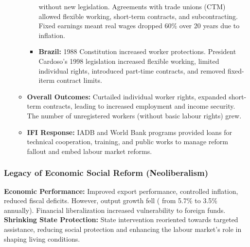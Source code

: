 \documentclass{article}
\begin{document}
\begin{itemize}
\begin{itemize}
\begin{itemize}
                without new legislation. Agreements with trade unions (CTM)
                allowed flexible working, short-term contracts, and
                subcontracting. Fixed earnings meant real wages dropped 60\%
                over 20 years due to inflation.
                \item \textbf{Brazil:} 1988 Constitution increased worker
                protections. President Cardoso's 1998 legislation increased
                flexible working, limited individual rights, introduced
                part-time contracts, and removed fixed-iterm contract limits.
            \end{itemize}
            \item \textbf{Overall Outcomes:} Curtailed individual worker
            rights, expanded short-term contracts, leading to increased
            employment and income security. The number of unregistered
            workers (without basic labour rights) grew.
            \item \textbf{IFI Response:} IADB and World Bank programs
            provided loans for technical cooperation, training, and public
            works to manage reform fallout and embed labour market reforms.
        \end{itemize}
    \end{itemize}

    \subsubsection{Legacy of Economic Social Reform (Neoliberalism)}

    \noindent \textbf{Economic Performance:} Improved export performance,
controlled inflation, reduced fiscal deficits. However, output growth fell (
from 5.7\% to 3.5\% annually). Financial liberalization increased
vulnerability to foreign funds.\\

    \noindent \textbf{Shrinking State Protection:} State intervention
reoriented towards targeted assistance, reducing social protection and
enhancing the labour market's role in shaping living conditions.\\
\end{document}
